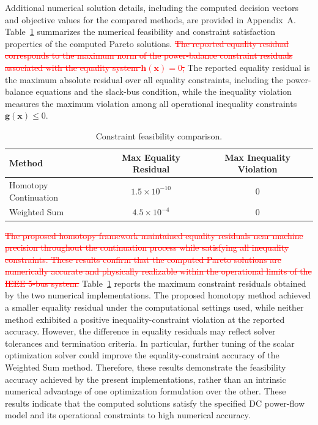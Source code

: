 \documentclass[11pt,pdflatex,sn-mathphys-ay]{sn-jnl}%
\theoremstyle{definition}
\theoremstyle{thmstyleone}%
\theoremstyle{thmstyletwo}%
\theoremstyle{thmstylethree}%
\newcommand{\del}[1]{\textcolor{red}{\sout{#1}}}
\newcommand{\add}[1]{\textcolor{revisionblue}{#1}}
\begin{document}
	
	Additional numerical solution details, including the computed decision vectors and objective values for the compared methods, are provided in Appendix~A.
	Table~\ref{tab:constraints_feas_opf} summarizes the numerical feasibility and constraint satisfaction properties of the computed Pareto solutions. 
	\del{The reported equality residual corresponds
		to the maximum norm of the power-balance
		constraint residuals associated with the
		equality system $\mathbf{h}(\bm{x})=0$,}
	\add{The reported equality residual is the
		maximum absolute residual over all equality
		constraints, including the power-balance
		equations and the slack-bus condition,} while the inequality violation measures the maximum violation among all operational inequality constraints \(\mathbf{g}(\bm{x})\leq0\).
	\begin{table}[h!]
		\centering
		\caption{Constraint feasibility comparison.}
		\label{tab:constraints_feas_opf}
		\begin{tabular}{lcc}
			\toprule
			Method & Max Equality Residual & Max Inequality Violation \\
			\midrule
			Homotopy Continuation & $1.5\times10^{-10}$ & $0$ \\
			Weighted Sum & $4.5\times10^{-4}$ & $0$ \\
			\bottomrule
		\end{tabular}
	\end{table}
	
	\del{The proposed homotopy framework maintained equality
		residuals near machine precision throughout the
		continuation process while satisfying all inequality
		constraints. These results confirm that the computed
		Pareto solutions are numerically accurate and physically
		realizable within the operational limits of the
		IEEE 5-bus system.}
	\add{Table~\ref{tab:constraints_feas_opf} reports the
		maximum constraint residuals obtained by the two
		numerical implementations. The proposed homotopy
		method achieved a smaller equality residual under
		the computational settings used, while neither method exhibited a positive
		inequality-constraint violation at the reported accuracy. However, the difference in equality
		residuals may reflect solver tolerances and
		termination criteria. In particular, further tuning
		of the scalar optimization solver could improve
		the equality-constraint accuracy of the Weighted
		Sum method. Therefore, these results demonstrate
		the feasibility accuracy achieved by the present
		implementations, rather than an intrinsic numerical
		advantage of one optimization formulation over
		the other.}
	\add{These results indicate that the computed
		solutions satisfy the specified DC power-flow
		model and its operational constraints to
		high numerical accuracy.}
	
\end{document}

